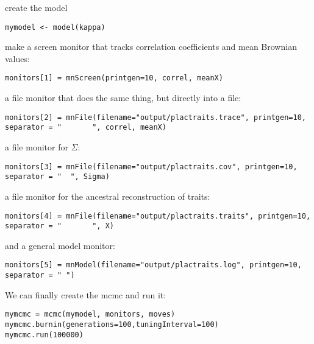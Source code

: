 create the model
{\tt \small \begin{snugshade*}
\begin{lstlisting}
mymodel <- model(kappa)
\end{lstlisting}
\end{snugshade*}}
\item
make a screen monitor that tracks correlation coefficients and mean Brownian values:
{\tt \small \begin{snugshade*}
\begin{lstlisting}
monitors[1] = mnScreen(printgen=10, correl, meanX)
\end{lstlisting}
\end{snugshade*}}
a file monitor that does the same thing, but directly into a file:
{\tt \small \begin{snugshade*}
\begin{lstlisting}
monitors[2] = mnFile(filename="output/plactraits.trace", printgen=10, separator = "       ", correl, meanX)
\end{lstlisting}
\end{snugshade*}}
a file monitor for $\Sigma$:
{\tt \small \begin{snugshade*}
\begin{lstlisting}
monitors[3] = mnFile(filename="output/plactraits.cov", printgen=10, separator = "  ", Sigma)
\end{lstlisting}
\end{snugshade*}}
a file monitor for the ancestral reconstruction of traits:
{\tt \small \begin{snugshade*}
\begin{lstlisting}
monitors[4] = mnFile(filename="output/plactraits.traits", printgen=10, separator = "       ", X)
\end{lstlisting}
\end{snugshade*}}
and a general model monitor:
{\tt \small \begin{snugshade*}
\begin{lstlisting}
monitors[5] = mnModel(filename="output/plactraits.log", printgen=10, separator = " ")
\end{lstlisting}
\end{snugshade*}}
We can finally create the mcmc and run it:
{\tt \small \begin{snugshade*}
\begin{lstlisting}
mymcmc = mcmc(mymodel, monitors, moves)
mymcmc.burnin(generations=100,tuningInterval=100)
mymcmc.run(100000)
\end{lstlisting}
\end{snugshade*}}


